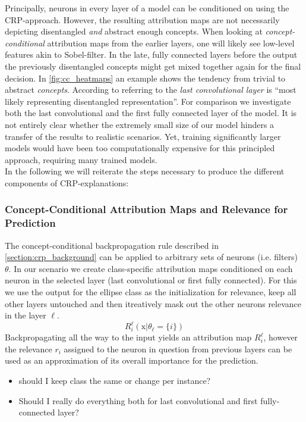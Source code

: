 Principally, neurons in every layer of a model can be conditioned on using the CRP-approach. However, the resulting attribution maps are not necessarily depicting disentangled \textit{and} abstract enough concepts. When looking at \textit{concept-conditional} attribution maps from the earlier layers, one will likely see low-level features akin to Sobel-filter. In the late, fully connected layers before the output the previously disentangled concepts might get mixed together again for the final decision. In \cref{fig:cc_heatmaps} an example shows the tendency from trivial to abstract \textit{concepts}. 
According to \cite{Dreyer2023a} referring to \cite{Zeiler2013} the \textit{last convolutional layer} is ``most likely representing disentangled representation''. For comparison we investigate both the last convolutional and the first fully connected layer of the model. It is not entirely clear whether the extremely small size of our model hinders a transfer of the results to realistic scenarios. Yet, training significantly larger models would have been too computationally expensive for this principled approach, requiring many trained models.\\

In the following we will reiterate the steps necessary to produce the different components of CRP-explanations:

\subsubsection{Concept-Conditional Attribution Maps and Relevance for Prediction}
The concept-conditional backpropagation rule described in \cref{section:crp_background} can be applied to arbitrary sets of neurons (i.e. filters) $\theta$. In our scenario we create class-specific attribution maps conditioned on each neuron in the selected layer (last convolutional or first fully connected). For this we use the output for the ellipse class as the initialization for relevance, keep all other layers untouched and then itreatively mask out the other neurons relevance in the layer $\ell$. 
\begin{equation}
    R_{i}^{\ell}(\mathrm{x} |\theta_{\ell}=\{i\}) 
\end{equation}
Backpropagating all the way to the input yields an attribution map $R_i^{\ell}$, however the relevance $r_i$ assigned to the neuron in question from previous layers can be used as an approximation of its overall importance for the prediction.

\begin{itemize}
    \item should I keep class the same or change per instance?
    \item Should I really do everything both for last convolutional and first fully-connected layer?
\end{itemize}

